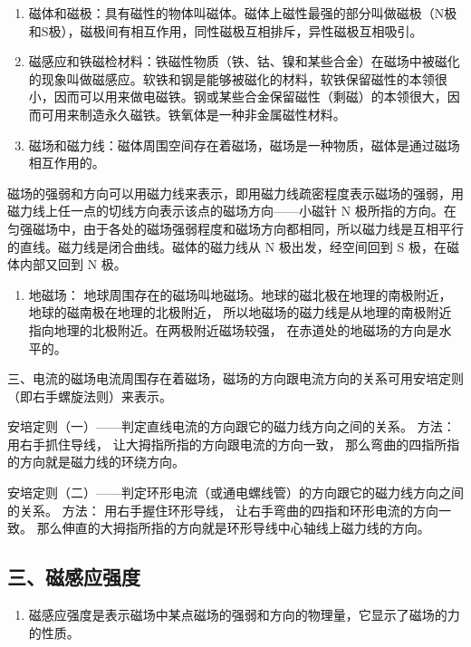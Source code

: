 \begin{enumerate}
\def\labelenumi{\arabic{enumi}.}
\item
  磁体和磁极：具有磁性的物体叫磁体。磁体上磁性最强的部分叫做磁极（N极和S极），磁极间有相互作用，同性磁极互相排斥，异性磁极互相吸引。
\item
  磁感应和铁磁检材料：铁磁性物质（铁、钴、镍和某些合金）在磁场中被磁化的现象叫做磁感应。软铁和钢是能够被磁化的材料，软铁保留磁性的本领很小，因而可以用来做电磁铁。钢或某些合金保留磁性（剩磁）的本领很大，因而可用来制造永久磁铁。铁氧体是一种非金属磁性材料。
\item
  磁场和磁力线：磁体周围空间存在着磁场，磁场是一种物质，磁体是通过磁场相互作用的。
\end{enumerate}

磁场的强弱和方向可以用磁力线来表示，即用磁力线疏密程度表示磁场的强弱，用磁力线上任一点的切线方向表示该点的磁场方向------小磁针
N
极所指的方向。在匀强磁场中，由于各处的磁场强弱程度和磁场方向都相同，所以磁力线是互相平行的直线。磁力线是闭合曲线。磁体的磁力线从
N 极出发，经空间回到 S 极，在磁体内部又回到 N 极。

\begin{enumerate}
\def\labelenumi{\arabic{enumi}.}
\setcounter{enumi}{3}
\tightlist
\item
  地磁场： 地球周围存在的磁场叫地磁场。地球的磁北极在地理的南极附近，
  地球的磁南极在地理的北极附近，
  所以地磁场的磁力线是从地理的南极附近指向地理的北极附近。在两极附近磁场较强，
  在赤道处的地磁场的方向是水平的。
\end{enumerate}

三、电流的磁场电流周围存在着磁场，磁场的方向跟电流方向的关系可用安培定则（即右手螺旋法则）来表示。

安培定则（一）------判定直线电流的方向跟它的磁力线方向之间的关系。
方法： 用右手抓住导线， 让大拇指所指的方向跟电流的方向一致，
那么弯曲的四指所指的方向就是磁力线的环绕方向。

安培定则（二）------判定环形电流（或通电螺线管）的方向跟它的磁力线方向之间的关系。
方法： 用右手握住环形导线， 让右手弯曲的四指和环形电流的方向一致。
那么伸直的大拇指所指的方向就是环形导线中心轴线上磁力线的方向。

\subsection{三、磁感应强度}\label{ux4e09ux78c1ux611fux5e94ux5f3aux5ea6}

\begin{enumerate}
\def\labelenumi{\arabic{enumi}.}
\tightlist
\item
  磁感应强度是表示磁场中某点磁场的强弱和方向的物理量，它显示了磁场的力的性质。
\end{enumerate}


